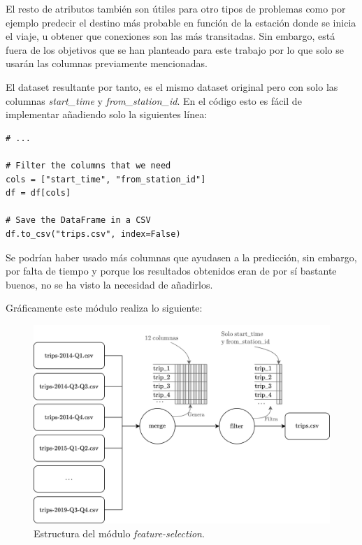 El resto de atributos también son útiles para otro tipos de problemas como por ejemplo predecir el destino más probable en función de la estación donde se inicia el viaje, u obtener que conexiones son las más transitadas. Sin embargo, está fuera de los objetivos que se han planteado para este trabajo por lo que solo se usarán las columnas previamente mencionadas.
\newline
 
El dataset resultante por tanto, es el mismo dataset original pero con solo las columnas \textit{start\_time} y \textit{from\_station\_id}. En el código esto es fácil de implementar añadiendo solo la siguientes línea:
\begin{verbatim}
# ...
    
# Filter the columns that we need
cols = ["start_time", "from_station_id"]
df = df[cols]

# Save the DataFrame in a CSV
df.to_csv("trips.csv", index=False)
\end{verbatim}

Se podrían haber usado más columnas que ayudasen a la predicción, sin embargo, por falta de tiempo y porque los resultados obtenidos eran de por sí bastante buenos, no se ha visto la necesidad de añadirlos.
\newline

Gráficamente este módulo realiza lo siguiente:
\begin{figure}[H]
    \centering
    \includegraphics[width=12cm]{images/solution/modules/feature-selection.png}
    \caption{Estructura del módulo \textit{feature-selection}.}
\end{figure}